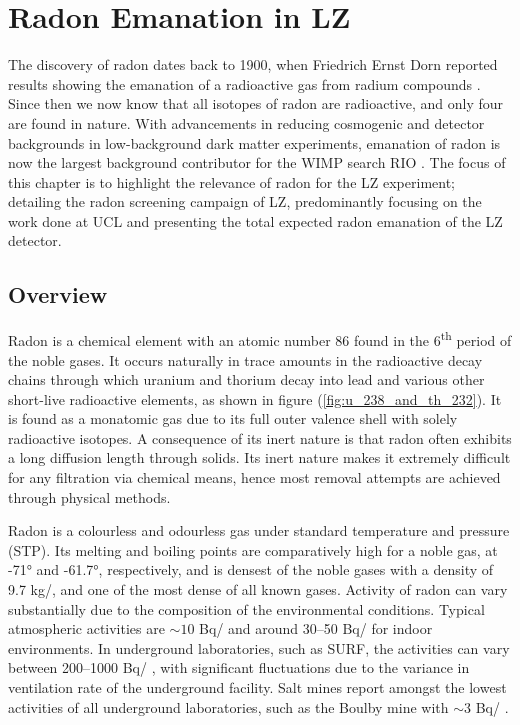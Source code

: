 \chapter{Radon Emanation in LZ}
\label{chap:chap4}

The discovery of radon dates back to 1900, when Friedrich Ernst Dorn reported results showing the emanation of a radioactive gas from radium compounds \cite{PARTINGTON1957}. Since then we now know that all isotopes of radon are radioactive, and only four are found in nature. With advancements in reducing cosmogenic and detector backgrounds in low-background dark matter experiments, emanation of radon is now the largest background contributor for the WIMP search RIO \cite{akerib2018projected}. The focus of this chapter is to highlight the relevance of radon for the LZ experiment; detailing the radon screening campaign of LZ, predominantly focusing on the work done at UCL and presenting the total expected radon emanation of the LZ detector.


\section{Overview}

Radon is a chemical element with an atomic number 86 found in the 6\textsuperscript{th} period of the noble gases. It occurs naturally in trace amounts in the radioactive decay chains through which uranium and thorium decay into lead and various other short-live radioactive elements, as shown in figure (\ref{fig:u_238_and_th_232}). It is found as a monatomic gas due to its full outer valence shell with solely radioactive isotopes. A consequence of its inert nature is that radon often exhibits a long diffusion length through solids. Its inert nature makes it extremely difficult for any filtration via chemical means, hence most removal attempts are achieved through physical methods. 

Radon is a colourless and odourless gas under standard temperature and pressure (STP). Its melting and boiling points are comparatively high for a noble gas, at -71\si{\degree} and -61.7\si{\degree}, respectively, and is densest of the noble gases with a density of 9.7 kg/\cubicmeter{}, and one of the most dense of all known gases. Activity of radon can vary substantially due to the composition of the environmental conditions. Typical atmospheric activities are $\sim10$ Bq/\cubicmeter{} and around 30--50 Bq/\cubicmeter{} for indoor environments. In underground laboratories, such as SURF, the activities can vary between 200--1000 Bq/\cubicmeter{} \cite{Heise_2015}, with significant fluctuations due to the variance in ventilation rate of the underground facility. Salt mines report amongst the lowest activities of all underground laboratories, such as the Boulby mine with $\sim3$ Bq/\cubicmeter{} \cite{scovell_boulby}. 

